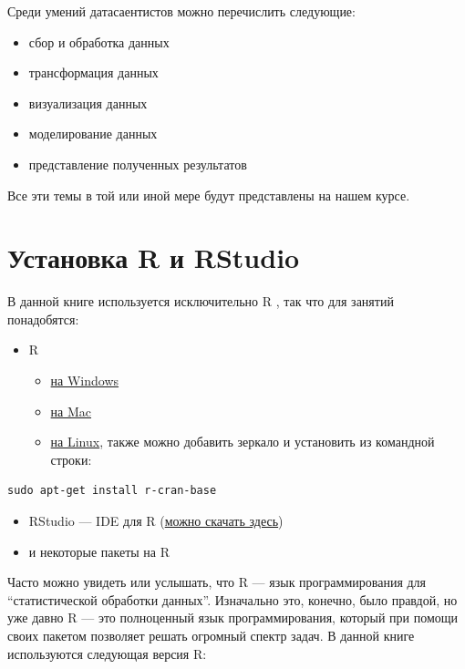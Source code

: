 \documentclass[]{book}
\providecommand{\tightlist}{%
  \setlength{\itemsep}{0pt}\setlength{\parskip}{0pt}}
\begin{document}
Среди умений датасаентистов можно перечислить следующие:

\begin{itemize}
\tightlist
\item
  сбор и обработка данных
\item
  трансформация данных
\item
  визуализация данных
\item
  моделирование данных
\item
  представление полученных результатов
\end{itemize}

Все эти темы в той или иной мере будут представлены на нашем курсе.

\hypertarget{r--rstudio}{%
\section{Установка R и RStudio}\label{r--rstudio}}

В данной книге используется исключительно R \citep{r_core_team19}, так что для занятий понадобятся:

\begin{itemize}
\tightlist
\item
  R

  \begin{itemize}
  \tightlist
  \item
    \href{https://cran.r-project.org/bin/windows/base/}{на Windows}
  \item
    \href{https://cran.r-project.org/bin/macosx/}{на Mac}
  \item
    \href{https://cran.rstudio.com/bin/linux/}{на Linux}, также можно добавить зеркало и установить из командной строки:
  \end{itemize}
\end{itemize}

\begin{verbatim}
sudo apt-get install r-cran-base
\end{verbatim}

\begin{itemize}
\tightlist
\item
  RStudio --- IDE для R (\href{https://www.rstudio.com/products/rstudio/download/}{можно скачать здесь})
\item
  и некоторые пакеты на R
\end{itemize}

Часто можно увидеть или услышать, что R --- язык программирования для ``статистической обработки данных''. Изначально это, конечно, было правдой, но уже давно R --- это полноценный язык программирования, который при помощи своих пакетом позволяет решать огромный спектр задач. В данной книге используются следующая версия R:
\end{document}
